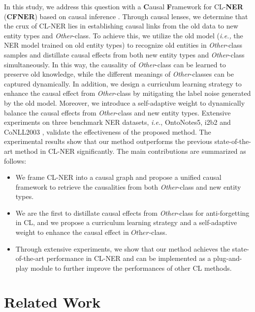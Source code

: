 \documentclass[11pt]{article}
\begin{document}
In this study, we address this question with a \textbf{C}ausal \textbf{F}ramework for CL-\textbf{NER} (\textbf{CFNER}) based on causal inference \citep{glymour2016causal,scholkopf2022causality}. 
Through causal lenses, we determine that the crux of CL-NER lies in establishing causal links from the old data to new entity types and \textit{Other}-class.
To achieve this, we utilize the old model (\textit{i.e.,} the NER model trained on old entity types) to recognize old entities in \textit{Other}-class samples and distillate causal effects \citep{glymour2016causal} from both new entity types and \textit{Other}-class simultaneously.
In this way, the causality of \textit{Other}-class can be learned to preserve old knowledge, while the different meanings of \textit{Other}-classes can be captured dynamically.
In addition, we design a curriculum learning \citep{bengio2009curriculum} strategy to enhance the causal effect from \textit{Other}-class by mitigating the label noise generated by the old model.
Moreover, we introduce a self-adaptive weight to dynamically balance the causal effects from \textit{Other}-class and new entity types.
Extensive experiments on three benchmark NER datasets, \textit{i.e.}, OntoNotes5, i2b2 \citep{murphy2010serving} and CoNLL2003 \citep{sang2003introduction}, validate the effectiveness of the proposed method.
The experimental results show that our method outperforms the previous state-of-the-art method in CL-NER significantly. The main contributions are summarized as follows:
\begin{itemize}
    \item We frame CL-NER into a causal graph \citep{pearl2009causality} and propose a unified causal framework to retrieve the causalities from both \textit{Other}-class and new entity types.
    \item We are the first to distillate causal effects from \textit{Other}-class for anti-forgetting in CL, and we propose a curriculum learning strategy and a self-adaptive weight to enhance the causal effect in $\textit{Other}$-class.
    \item Through extensive experiments, we show that our method achieves the state-of-the-art performance in CL-NER and can be implemented as a plug-and-play module to further improve the performances of other CL methods.
\end{itemize}

\section{Related Work}
\end{document}
